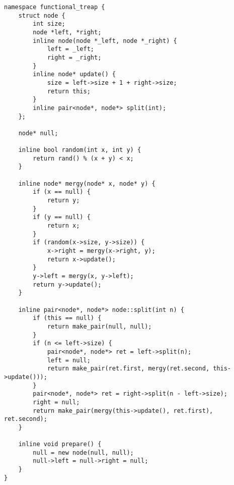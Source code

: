 \begin{lstlisting}
namespace functional_treap {
	struct node {
		int size;
		node *left, *right;
		inline node(node *_left, node *_right) {
			left = _left;
			right = _right;
		}
		inline node* update() {
			size = left->size + 1 + right->size;
			return this;
		}
		inline pair<node*, node*> split(int);
	};
 
	node* null;
 
	inline bool random(int x, int y) {
		return rand() % (x + y) < x;
	}
 
	inline node* mergy(node* x, node* y) {
		if (x == null) {
			return y;
		}
		if (y == null) {
			return x;
		}
		if (random(x->size, y->size)) {
			x->right = mergy(x->right, y);
			return x->update();
		}
		y->left = mergy(x, y->left);
		return y->update();
	}
 
	inline pair<node*, node*> node::split(int n) {
		if (this == null) {
			return make_pair(null, null);
		}
		if (n <= left->size) {
			pair<node*, node*> ret = left->split(n);
			left = null;
			return make_pair(ret.first, mergy(ret.second, this->update()));
		}
		pair<node*, node*> ret = right->split(n - left->size);
		right = null;
		return make_pair(mergy(this->update(), ret.first), ret.second);
	}
 
	inline void prepare() {
		null = new node(null, null);
		null->left = null->right = null;
	}
}
\end{lstlisting}
